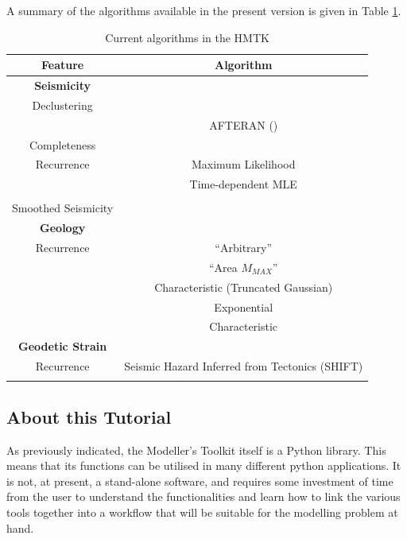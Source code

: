 A summary of the algorithms available in the present version is given in Table \ref{tab:current_features}.
\begin{table}
\centering
\begin{tabular}{|c|c|} \hline
Feature & Algorithm\\ \hline
\textbf{Seismicity} & \\ \hline
Declustering & \cite{GardnerKnopoff1974}  \\
    & AFTERAN (\cite{Musson1999}) \\ \hline
Completeness & \cite{Stepp1971}\\ \hline
Recurrence & Maximum Likelihood \cite{Aki1965}\\
 & Time-dependent MLE\\
 & \cite{Weichert1980}\\ \hline
 Smoothed Seismicity & \cite{frankel1995} \\ \hline
 \textbf{Geology} & \\ \hline
 Recurrence & \cite{AndersonLuco1983} ``Arbitrary''\\
  & \cite{AndersonLuco1983} ``Area $M_{MAX}$''\\
  & Characteristic (Truncated Gaussian) \\
  & \cite{YoungsCoppersmith1985} Exponential\\
  & \cite{YoungsCoppersmith1985} Characteristic\\ \hline
 \textbf{Geodetic Strain} & \\ \hline
 Recurrence & Seismic Hazard Inferred from Tectonics (SHIFT) \\
           &  \cite{BirdLiu2007, Bird_etal2010} \\ \hline
\end{tabular}
\caption{Current algorithms in the HMTK}
\label{tab:current_features}
\end{table}

\subsection{About this Tutorial}

As previously indicated, the Modeller's Toolkit itself is a Python library. This means that its functions can be utilised in many different python applications. It is not, at present, a stand-alone software, and requires some investment of time from the user to understand the functionalities and learn how to link the various tools together into a workflow that will be suitable for the modelling problem at hand.

